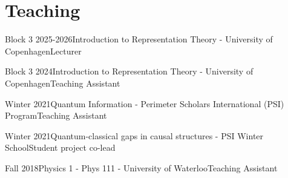 \documentclass[10pt]{article}
\begin{document}
    \section{Teaching}
    \begin{teachinglist}
        \item{Block 3 2025-2026}{Introduction to Representation Theory - University of Copenhagen}{Lecturer}{}
        \item{Block 3 2024}{Introduction to Representation Theory - University of Copenhagen}{Teaching Assistant}{}
        \item{Winter 2021}{Quantum Information - Perimeter Scholars International (PSI) Program}{Teaching Assistant}{}
        \item{Winter 2021}{Quantum-classical gaps in causal structures  - PSI Winter School}{Student project co-lead}{}
        \item{Fall 2018}{Physics 1 - Phys 111 - University of Waterloo}{Teaching Assistant}{}
    \end{teachinglist}
\end{document}
